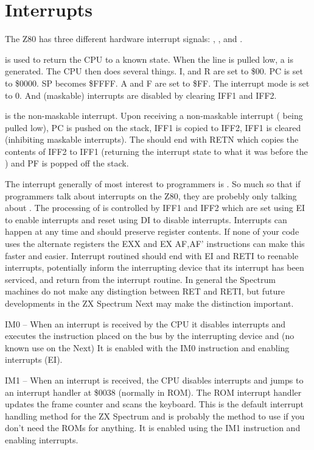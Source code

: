 \chapter{Interrupts}
The Z80 has three different hardware interrupt signals:
, , and .

 is used to return the CPU to a known state. When
the  line is pulled low, a  is
generated. The CPU then does several things. I, and R are set to \$00.
PC is set to \$0000. SP becomes \$FFFF. A and F are set to \$FF.  The
interrupt mode is set to 0. And (maskable) interrupts are disabled by
clearing IFF1 and IFF2.

 is the non-maskable interrupt. Upon receiving a
non-maskable interrupt ( being pulled low), PC is
pushed on the stack, IFF1 is copied to IFF2, IFF1 is cleared
(inhibiting maskable interrupts). The  should end
with RETN which copies the contents of IFF2 to IFF1 (returning the
interrupt state to what it was before the ) and PF is
popped off the stack.

The interrupt generally of most interest to programmers is
. So much so that if programmers talk about
interrupts on the Z80, they are probebly only talking about
. The processing of  is controlled
by IFF1 and IFF2 which are set using EI to enable interrupts and reset
using DI to disable interrupts. Interrupts can happen at any time and
should preserve register contents.  If none of your code uses the
alternate registers the EXX and EX AF,AF’ instructions can make this
faster and easier. Interrupt routined should end with EI and RETI to
reenable interrupts, potentially inform the interrupting device that
its interrupt has been serviced, and return from the interrupt
routine. In general the Spectrum machines do not make any distingtion
between RET and RETI, but future developments in the ZX Spectrum Next
may make the distinction important.
 
IM0 – When an interrupt is received by the CPU it disables interrupts
and executes the instruction placed on the bus by the interrupting
device and (no known use on the Next) It is enabled with the IM0
instruction and enabling interrupts (EI).

IM1 – When an interrupt is received, the CPU disables interrupts and
jumps to an interrupt handler at \$0038 (normally in ROM). The ROM
interrupt handler updates the frame counter and scans the
keyboard. This is the default interrupt handling method for the ZX
Spectrum and is probably the method to use if you don’t need the ROMs
for anything. It is enabled using the IM1 instruction and enabling
interrupts.

